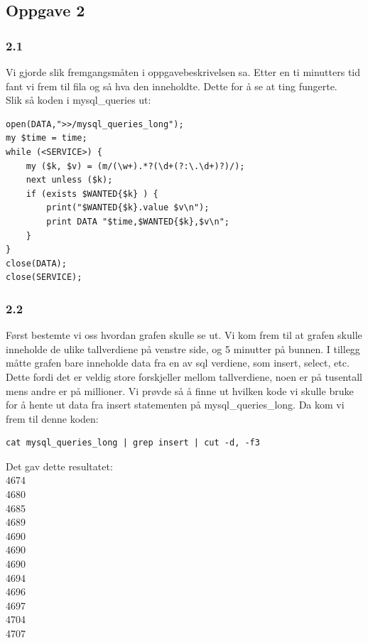 \documentclass[a4paper, norsk, 12pt]{article}
\begin{document}
\subsection{Oppgave 2}
\subsubsection*{2.1}
Vi gjorde slik fremgangsmåten i oppgavebeskrivelsen sa. Etter en ti minutters tid fant vi frem til fila og så hva den inneholdte. Dette for å se at ting fungerte.\\

Slik så koden i mysql\_queries ut:
\begin{verbatim}
open(DATA,">>/mysql_queries_long");
my $time = time;
while (<SERVICE>) {
    my ($k, $v) = (m/(\w+).*?(\d+(?:\.\d+)?)/);
    next unless ($k);
    if (exists $WANTED{$k} ) {
        print("$WANTED{$k}.value $v\n");
        print DATA "$time,$WANTED{$k},$v\n";
    }
}
close(DATA);
close(SERVICE);
\end{verbatim}

\subsubsection*{2.2}
Først bestemte vi oss hvordan grafen skulle se ut. Vi kom frem til at grafen skulle inneholde de ulike tallverdiene på venstre side, og 5 minutter på bunnen. I tillegg måtte grafen bare inneholde data fra en av sql verdiene, som insert, select, etc. Dette fordi det er veldig store forskjeller mellom tallverdiene, noen er på tusentall mens andre er på millioner. Vi prøvde så å finne ut hvilken kode vi skulle bruke for å hente ut data fra insert statementen på mysql\_queries\_long. Da kom vi frem til denne koden:

\begin{verbatim}
cat mysql_queries_long | grep insert | cut -d, -f3
\end{verbatim}

Det gav dette resultatet:\\
4674\\
4680\\
4685\\
4689\\
4690\\
4690\\
4690\\
4694\\
4696\\
4697\\
4704\\
4707\\
\end{document}
